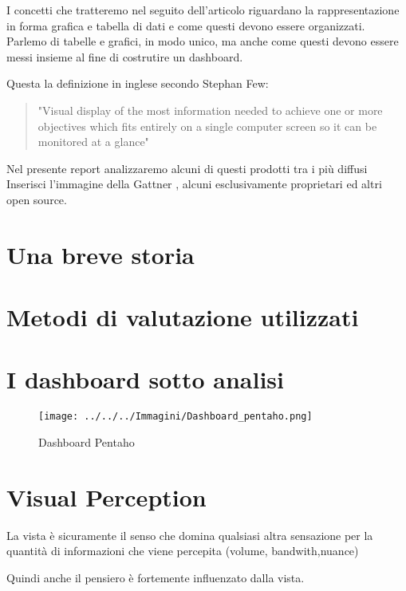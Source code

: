 \documentclass{ium}
\begin{document}
I concetti che tratteremo nel seguito dell'articolo riguardano la rappresentazione in forma grafica e tabella di dati e come questi devono essere organizzati. Parlemo di tabelle e grafici, in modo unico, ma anche come questi devono essere messi insieme al fine di costrutire un dashboard.

Questa la definizione in inglese secondo Stephan Few:
\begin{quotation}
"Visual display of the most information needed to achieve one or more objectives which fits entirely on a single computer screen so it can be monitored at a glance"
\end{quotation}


Nel presente report analizzaremo alcuni di questi prodotti tra i più diffusi
{Inserisci l'immagine della Gattner} , alcuni esclusivamente proprietari ed altri open source.

\section{Una breve storia}


\section{Metodi di valutazione utilizzati}
\section{I dashboard sotto analisi}
\begin{center}




	\begin{figure*}
	\texttt{[image: ../../../Immagini/Dashboard\_pentaho.png]} 
	\caption{Dashboard Pentaho}

	\end{figure*}
\end{center}

\section{Visual Perception}

La vista è sicuramente il senso che domina qualsiasi altra sensazione per la quantità di informazioni che viene percepita (volume, bandwith,nuance)

Quindi anche il pensiero è fortemente influenzato dalla vista.
\end{document}
